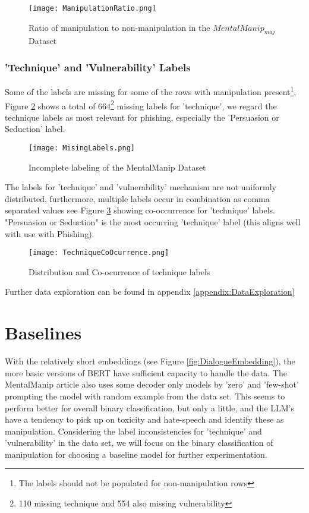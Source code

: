 \documentclass[
	letterpaper, %
	12pt, %
	unnumberedsections, %
	twoside, %
]{LTJournalArticle}
\begin{document}
\begin{figure}[!htp] %
	\centering
	\texttt{[image: ManipulationRatio.png]}
	\caption{Ratio of manipulation to non-manipulation in the $MentalManip_{maj}$ Dataset}
	\label{fig:ManipulationRatio}
\end{figure}

\subsubsection{'Technique' and 'Vulnerability' Labels}
Some of the labels are missing for some of the rows with manipulation present\footnote{The labels should not be populated for non-manipulation rows}, Figure \ref{fig:MissingLabels} shows a total of 664\footnote{110 missing technique and 554 also missing vulnerability} missing labels for 'technique', we regard the technique labels as most relevant for phishing, especially the 'Persuasion or Seduction' label.
\begin{figure}[!htp] %
	\centering
	\texttt{[image: MisingLabels.png]}
	\caption{Incomplete labeling of the MentalManip Dataset}
	\label{fig:MissingLabels}
\end{figure}

The labels for 'technique' and 'vulnerability' mechanism are not uniformly distributed, furthermore, multiple labels occur in combination as comma separated values see Figure \ref{fig:TechCoOcurrence} showing co-occurrence for 'technique' labels. "Persuasion or Seduction" is the most occurring 'technique' label (this aligns well with use with Phishing).

\begin{figure}[!htp] %
	\centering
	\texttt{[image: TechniqueCoOcurrence.png]}
	\caption{Distribution and Co-ocurrence of technique labels}
	\label{fig:TechCoOcurrence}
\end{figure}

Further data exploration can be found in appendix \ref{appendix:DataExploration}




\section{Baselines}
With the relatively short embeddings (see Figure \ref{fig:DialogueEmbedding}), the more basic versions of BERT have sufficient capacity to handle the data. The MentalManip article \cite{MentalManip} also uses some decoder only models by 'zero' and 'few-shot' prompting the model with random example from the data set. This seems to perform better for overall binary classification, but only a little, and the LLM's have a tendency to pick up on toxicity and hate-speech and identify these as manipulation.
Considering the label inconsistencies for 'technique' and 'vulnerability' in the data set, we will focus on the binary classification of manipulation for choosing a baseline model for further experimentation.
\end{document}
